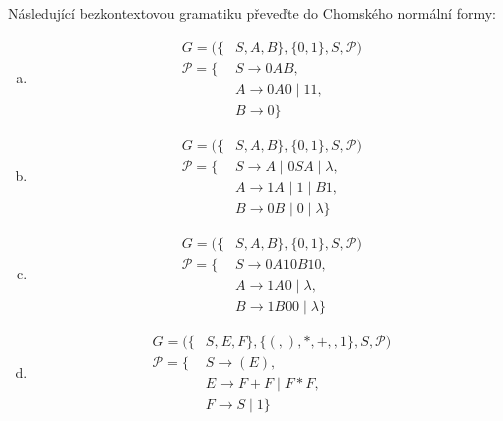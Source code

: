 \documentclass[a4paper,12pt]{amsart}
\begin{document}
    
\medskip\begin{problem}

    Následující bezkontextovou gramatiku převeďte do Chomského normální formy:

    \begin{multicols}{2}
        \begin{enumerate}[(a)]
    
            \item 
            \begin{align*}
            G=(\{&S,A,B\},\{0,1\},S,\mathcal P)\\
            \mathcal P=\{&S\rightarrow 0AB, \\
            &A\rightarrow 0A0\mid 11,\\
            &B\rightarrow 0\}
            \end{align*}
        
            \item 
            \begin{align*}
            G=(\{&S,A,B\},\{0,1\},S,\mathcal P)\\
            \mathcal P=\{&S\rightarrow A\mid 0SA\mid \lambda, \\
            &A\rightarrow 1A\mid 1\mid B1,\\
            &B\rightarrow 0B\mid 0\mid \lambda\} 
            \end{align*}
    
            \item 
            \begin{align*}
            G=(\{&S,A,B\},\{0,1\},S,\mathcal P)\\
            \mathcal P=\{
            &S\rightarrow 0A10B10, \\
            &A\rightarrow 1A0\mid \lambda,\\
            &B\rightarrow 1B00\mid \lambda\} 
            \end{align*}
    
            \item 
            \begin{align*}
            G=(\{&S,E,F\},\{(,),*,+,,1\},S,\mathcal P)\\
            \mathcal P=\{&
            S\rightarrow (E), \\
            &E\rightarrow F+F\mid F*F,\\
            &F\rightarrow S\mid 1\}
            \end{align*}

        \end{enumerate}
    \end{multicols}
        
\end{problem}
    
\end{document}

